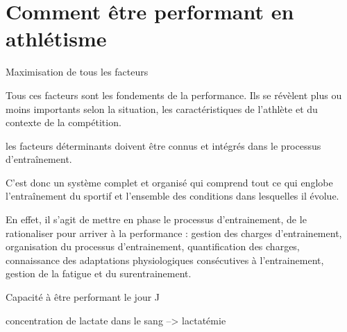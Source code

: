     \section {Comment être performant en athlétisme}

    Maximisation de tous les facteurs
    
    Tous ces facteurs sont les fondements de la performance. Ils se révèlent plus ou moins importants selon la situation, les caractéristiques de l’athlète et du contexte de la compétition.

les facteurs déterminants doivent être connus et intégrés dans le processus d’entraînement.

C’est donc un système complet et organisé qui comprend tout ce qui englobe l’entraînement du sportif et l’ensemble des conditions dans lesquelles il évolue.

En effet, il s’agit de mettre en phase le processus d’entrainement, de le rationaliser pour arriver à la performance : gestion des charges d’entrainement, organisation du processus d’entrainement, quantification des charges, connaissance des adaptations physiologiques consécutives à l’entrainement, gestion de la fatigue et du surentrainement.

Capacité à être performant le jour J
    
    


concentration de lactate dans le sang --> lactatémie



